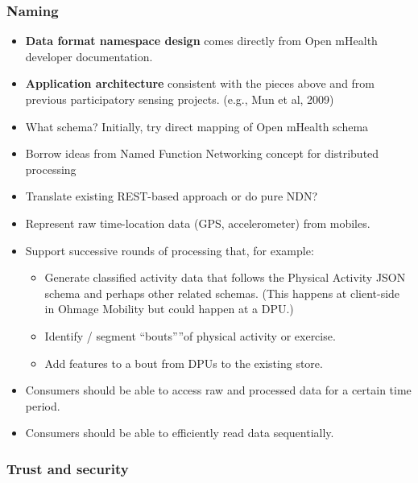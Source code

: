 \subsubsection{Naming} 
\begin{itemize}
\item \textbf{Data format namespace design} comes directly from Open mHealth developer documentation. 
\item \textbf{Application architecture} consistent with the pieces above and from previous participatory sensing projects. (e.g., Mun et al, 2009)
\item What schema? Initially, try direct mapping of Open mHealth schema
\item Borrow ideas from Named Function Networking concept for distributed processing
\item Translate existing REST-based approach or do pure NDN? 
\item Represent raw time-location data (GPS, accelerometer) from mobiles. 
\item Support successive rounds of processing that, for example:  
    \begin{itemize}
    \item Generate classified activity data that follows the Physical Activity JSON schema and perhaps other related schemas.  (This happens at client-side in Ohmage Mobility but could happen at a DPU.)	
    \item Identify / segment ``bouts”''of physical activity or exercise. 
    \item Add features to a bout from DPUs to the existing store. 
    \end{itemize}
\item Consumers should be able to access raw and processed data for a certain time period.
\item Consumers should be able to efficiently read data sequentially. 
\end{itemize}

\subsubsection{Trust and security}

